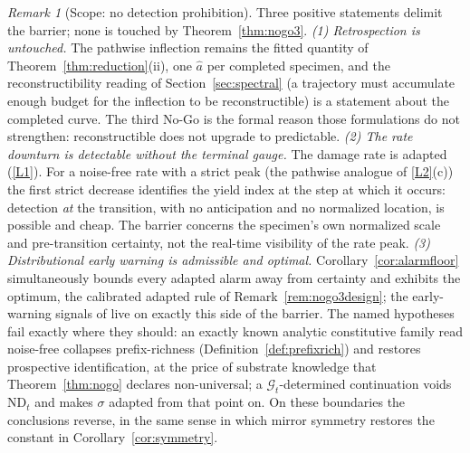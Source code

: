 \documentclass[11pt]{article}
\theoremstyle{plain}
\theoremstyle{definition}
\theoremstyle{remark}
\newtheorem{remark}[theorem]{Remark}
\begin{document}
\begin{remark}[Scope: no detection prohibition]\label{rem:nogo3scope}
Three positive statements delimit the barrier; none is touched by Theorem~\ref{thm:nogo3}. \emph{(1) Retrospection is untouched.} The pathwise inflection remains the fitted quantity of Theorem~\ref{thm:reduction}(ii), one $\hat a$ per completed specimen, and the reconstructibility reading of Section~\ref{sec:spectral} (a trajectory must accumulate enough budget for the inflection to be reconstructible) is a statement about the completed curve. The third No-Go is the formal reason those formulations do not strengthen: reconstructible does not upgrade to predictable. \emph{(2) The rate downturn is detectable without the terminal gauge.} The damage rate is adapted (\ref{L1}). For a noise-free rate with a strict peak (the pathwise analogue of \ref{L2}(c)) the first strict decrease identifies the yield index at the step at which it occurs: detection \emph{at} the transition, with no anticipation and no normalized location, is possible and cheap. The barrier concerns the specimen's own normalized scale and pre-transition certainty, not the real-time visibility of the rate peak. \emph{(3) Distributional early warning is admissible and optimal.} Corollary~\ref{cor:alarmfloor} simultaneously bounds every adapted alarm away from certainty and exhibits the optimum, the calibrated adapted rule of Remark~\ref{rem:nogo3design}; the early-warning signals of \citep{scheffer2009} live on exactly this side of the barrier. The named hypotheses fail exactly where they should: an exactly known analytic constitutive family read noise-free collapses prefix-richness (Definition~\ref{def:prefixrich}) and restores prospective identification, at the price of substrate knowledge that Theorem~\ref{thm:nogo} declares non-universal; a $\mathcal G_t$-determined continuation voids $\mathrm{ND}_t$ and makes $\sigma$ adapted from that point on. On these boundaries the conclusions reverse, in the same sense in which mirror symmetry restores the constant in Corollary~\ref{cor:symmetry}.
\end{remark}
\end{document}
